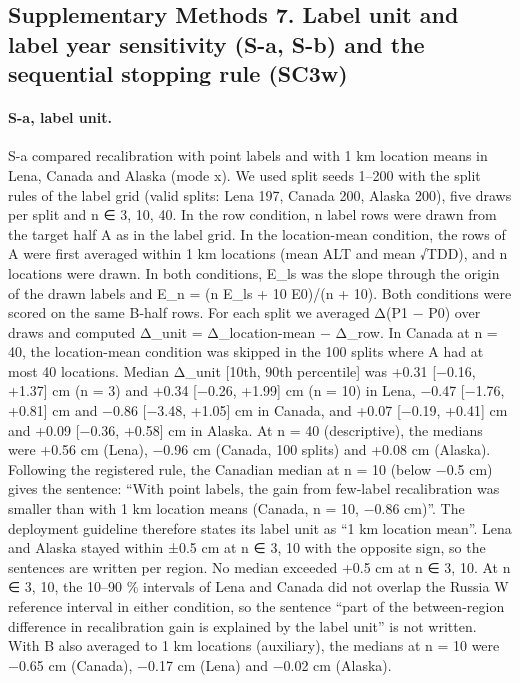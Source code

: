 \subsection*{Supplementary Methods 7. Label unit and label year sensitivity (S-a, S-b) and the sequential stopping rule (SC3w)}

\paragraph*{S-a, label unit.} S-a compared recalibration with point labels and with 1 km location means in Lena, Canada and Alaska (mode x). We used split seeds 1–200 with the split rules of the label grid (valid splits: Lena 197, Canada 200, Alaska 200), five draws per split and n ∈ {3, 10, 40}. In the row condition, n label rows were drawn from the target half A as in the label grid. In the location-mean condition, the rows of A were first averaged within 1 km locations (mean ALT and mean √TDD), and n locations were drawn. In both conditions, E\_ls was the slope through the origin of the drawn labels and E\_n = (n E\_ls + 10 E0)/(n + 10). Both conditions were scored on the same B-half rows. For each split we averaged Δ(P1 − P0) over draws and computed Δ\_unit = Δ\_location-mean − Δ\_row. In Canada at n = 40, the location-mean condition was skipped in the 100 splits where A had at most 40 locations. Median Δ\_unit [10th, 90th percentile] was +0.31 [−0.16, +1.37] cm (n = 3) and +0.34 [−0.26, +1.99] cm (n = 10) in Lena, −0.47 [−1.76, +0.81] cm and −0.86 [−3.48, +1.05] cm in Canada, and +0.07 [−0.19, +0.41] cm and +0.09 [−0.36, +0.58] cm in Alaska. At n = 40 (descriptive), the medians were +0.56 cm (Lena), −0.96 cm (Canada, 100 splits) and +0.08 cm (Alaska). Following the registered rule, the Canadian median at n = 10 (below −0.5 cm) gives the sentence: ``With point labels, the gain from few-label recalibration was smaller than with 1 km location means (Canada, n = 10, −0.86 cm)''. The deployment guideline therefore states its label unit as ``1 km location mean''. Lena and Alaska stayed within ±0.5 cm at n ∈ {3, 10} with the opposite sign, so the sentences are written per region. No median exceeded +0.5 cm at n ∈ {3, 10}. At n ∈ {3, 10}, the 10–90 \% intervals of Lena and Canada did not overlap the Russia W reference interval in either condition, so the sentence ``part of the between-region difference in recalibration gain is explained by the label unit'' is not written. With B also averaged to 1 km locations (auxiliary), the medians at n = 10 were −0.65 cm (Canada), −0.17 cm (Lena) and −0.02 cm (Alaska).

